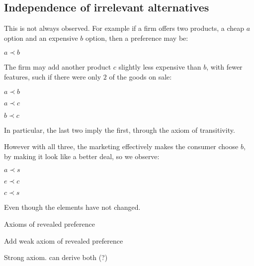 \subsection{Independence of irrelevant alternatives}

This is not always observed. For example if a firm offers two products, a cheap \(a\) option and an expensive \(b\) option, then a preference may be:

\(a\prec b\)

The firm may add another product \(c\) slightly less expensive than \(b\), with fewer features, such if there were only \(2\) of the goods on sale:

\(a\prec b\)

\(a\prec c\)

\(b\prec c\)

In particular, the last two imply the first, through the axiom of transitivity.

However with all three, the marketing effectively makes the consumer choose \(b\), by making it look like a better deal, so we observe:

\(a\prec s\)

\(e\prec c\)

\(c\prec s\)

Even though the elements have not changed.

Axioms of revealed preference

Add weak axiom of revealed preference

Strong axiom. can derive both (?)

